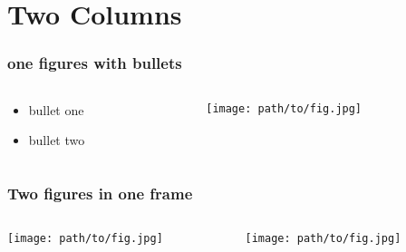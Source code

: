 \documentclass[10pt]{beamer}
\begin{document}
\section{Two Columns}
\label{sec-2}
\begin{frame}
\frametitle{one figures with bullets}
\label{sec-2-1}
\begin{columns}
\begin{column}{0.4\textwidth}
\label{sec-2-1-1}

\begin{itemize}
\item bullet one
\item bullet two
\end{itemize}
\end{column}
\begin{column}{0.6\textwidth}
\label{sec-2-1-2}

\texttt{[image: path/to/fig.jpg]}
\end{column}
\end{columns}
\end{frame}
\begin{frame}
\frametitle{Two figures in one frame}
\label{sec-2-2}
\begin{columns}
\begin{column}{0.5\textwidth}
\label{sec-2-2-1}

\texttt{[image: path/to/fig.jpg]}
\end{column}
\begin{column}{0.5\textwidth}
\label{sec-2-2-2}

\texttt{[image: path/to/fig.jpg]}
\end{column}
\end{columns}
\end{frame}
\end{document}

